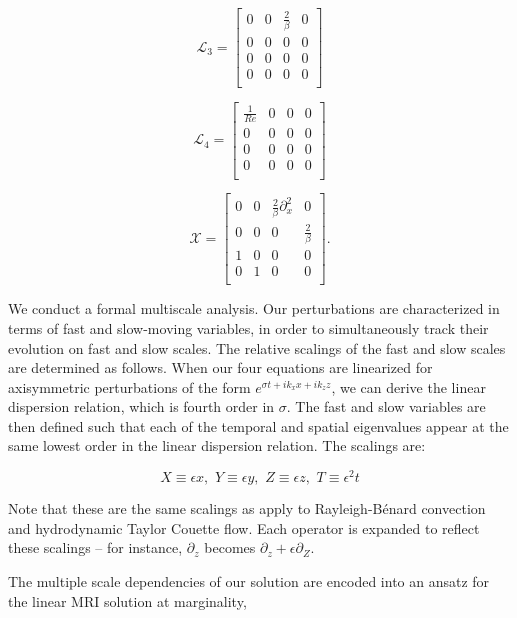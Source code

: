 \documentclass{emulateapj}
\newcommand{\beq}{\begin{equation}}
\newcommand{\eeq}{\end{equation}}
\newcommand\reye{\mathrel{Re}}
\begin{document}
\beq
\mathcal{L}_3 = \left[\begin{matrix}
0 & 0 & \frac{2}{\beta} & 0 \\
0 & 0 & 0 & 0 \\
0 & 0 & 0 & 0 \\
0 & 0 & 0 & 0 \\ \end{matrix} \right]
\eeq

\beq
\mathcal{L}_4 = \left[\begin{matrix}
\frac{1}{\reye} & 0 & 0 & 0 \\
0 & 0 & 0 & 0 \\
0 & 0 & 0 & 0 \\
0 & 0 & 0 & 0 \\ \end{matrix}\right] 
\eeq

\beq
\mathcal{X} = \left[\begin{matrix}
0 & 0 & \frac{2}{\beta}\partial_x^2 & 0 \\
0 & 0 & 0 & \frac{2}{\beta} \\
1 & 0 & 0 & 0 \\
0 & 1 & 0 & 0 \\ \end{matrix} \right]. 
\eeq


We conduct a formal multiscale analysis. Our perturbations are characterized in terms of fast and slow-moving variables, in order to simultaneously track their evolution on fast and slow scales. The relative scalings of the fast and slow scales are determined as follows. When our four equations are linearized for axisymmetric perturbations of the form $e^{\sigma t + i k_x x + i k_z z}$, we can derive the linear dispersion relation, which is fourth order in $\sigma$. The fast and slow variables are then defined such that each of the temporal and spatial eigenvalues appear at the same lowest order in the linear dispersion relation. The scalings are: 

\beq
X \equiv \epsilon x,  \, \, Y \equiv \epsilon y, \, \, Z \equiv \epsilon z, \, \, T \equiv \epsilon^2 t
\eeq

Note that these are the same scalings as apply to Rayleigh-B\'enard convection and hydrodynamic Taylor Couette flow. Each operator is expanded to reflect these scalings -- for instance, $\partial_z$ becomes $\partial_z + \epsilon\partial_Z$. 

The multiple scale dependencies of our solution are encoded into an ansatz for the linear MRI solution at marginality,
\end{document}
